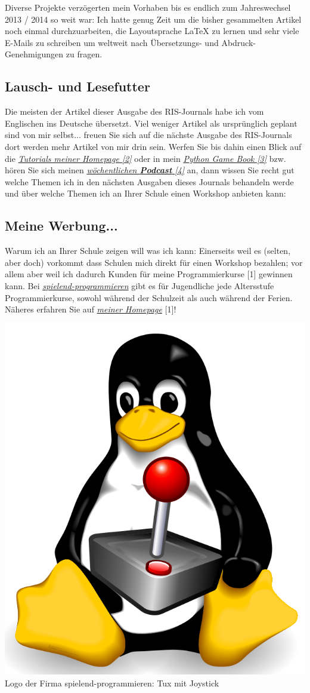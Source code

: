 Diverse Projekte verzögerten mein Vorhaben bis es endlich zum Jahreswechsel 2013 / 2014 so weit war: Ich hatte genug Zeit um die bisher gesammelten Artikel noch einmal durchzuarbeiten, die Layoutsprache {\large \LaTeX} zu lernen und sehr viele E-Mails zu schreiben um weltweit nach Übersetzungs- und Abdruck-Genehmigungen zu fragen. 

\subsection*{Lausch- und Lesefutter}
Die meisten der Artikel dieser Ausgabe des RIS-Journals habe ich vom Englischen ins Deutsche übersetzt. Viel weniger Artikel als ursprünglich geplant sind von mir selbst... freuen Sie sich auf die nächste Ausgabe des RIS-Journals dort werden mehr Artikel von mir drin sein. Werfen Sie bis dahin einen Blick auf die \href{http://spielend-programmieren.at/de:tutorials:start}{\textit{Tutorials meiner Homepage [2]}} oder in mein \href{http://thepythongamebook.com}{\textit{Python Game Book [3]}} bzw. hören Sie sich meinen \href{http://biertaucher.at}{\textit{wöchentlichen \textbf{Podcast} [4]}} an, dann wissen Sie recht gut welche Themen ich in den nächsten Ausgaben dieses Journals behandeln werde und über welche Themen ich an Ihrer Schule einen Workshop anbieten kann:

\subsection*{Meine Werbung...}
Warum ich an Ihrer Schule zeigen will was ich kann: Einerseits weil es (selten, aber doch) vorkommt dass Schulen mich direkt für einen Workshop bezahlen; vor allem aber weil ich dadurch Kunden für meine Programmierkurse [1] gewinnen kann. Bei \href{http://spielend-programmieren.at}{\textit{spielend-programmieren}} gibt es für Jugendliche jede Altersstufe Programmierkurse, sowohl während der Schulzeit als auch während der Ferien. Näheres erfahren Sie auf \href{http://spielend-programmieren.at}{\textit{meiner Homepage}} [1]!

\begin{center}
\includegraphics[width=0.5\linewidth]{editorial/editorial-tuxstick3.png}\\
\footnotesize{Logo der Firma spielend-programmieren: Tux mit Joystick}
\end{center}

